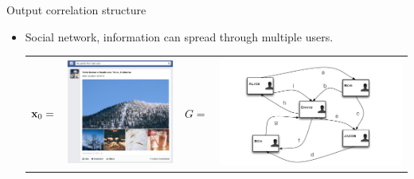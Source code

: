 \documentclass[first=dgreen,second=purple,logo=red]{aaltoslides}
\begin{document}
\begin{frame}[allowframebreaks]{Output correlation structure}
\begin{itemize}
		\item Social network, information can spread through multiple users.
		\begin{center}
			\begin{tabular}{cccc} 
		    $\mathbf {x}_0=$ & \multirow{2}{*}{\includegraphics[scale = 0.15]{./figures/facebookvideo.png}}
			&$G=$& \multirow{2}{*}{\includegraphics[scale = 0.25]{./figures/motivation_1.pdf}}\\
		    \end{tabular}
		\newline
		\newline
		\newline
		\newline

\end{center}
\end{itemize}
\end{frame}
\end{document}
